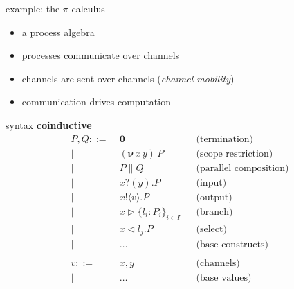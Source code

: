 \documentclass[dvipsnames]{beamer}
\newcommand{\sitem}{\item[\raisebox{.45ex}{\rule{.6ex}{.6ex}}]}
\newcommand{\picalc}{$\pi$-calculus}
\newcommand{\PO}{\textbf{0}}
\newcommand{\comp}[2]{#1 \parallel #2}
\newcommand{\new}[2]{(\boldsymbol{\nu} \, #1 \, #2) \,}
\newcommand{\send}[2]{#1 !\langle #2 \rangle .}
\newcommand{\recv}[2]{#1 ?( #2 ) .}
\newcommand{\branch}[3]{#1 \triangleright \{ #2 \}_{#3}}
\newcommand{\select}[2]{#1 \triangleleft #2 .}
\begin{document}
  \begin{frame}{example: the \picalc{}}
    \begin{itemize}
      \setlength\itemsep{1em}
      \sitem a process algebra
      \sitem processes communicate over channels
      \sitem channels are sent over channels (\emph{channel mobility})
      \sitem communication drives computation
    \end{itemize}
  \end{frame}

  \begin{frame}{syntax}
    \textbf{coinductive}
    \begin{align*}
        P, Q ::=& \; \PO                     &&\text{(termination)}    \\
        |& \; \new{x}{y}P                    &&\text{(scope restriction)} \\
        |& \; \comp{P}{Q}                    &&\text{(parallel composition)} \\
        |& \; \recv{x}{y}P                   &&\text{(input)}       \\
        |& \; \send{x}{v}P                   &&\text{(output)}       \\
        |& \; \branch{x}{l_i : P_i}{i \in I} &&\text{(branch)}       \\
        |& \; \select{x}{l_j}P               &&\text{(select)}       \\
        |& \; \ldots                         &&\text{(base constructs)} \\
        \\
        v ::=& \; x, y && \text{(channels)}\\
        | & \; \ldots && \text{(base values)}\\
    \end{align*}
  \end{frame}
\end{document}
